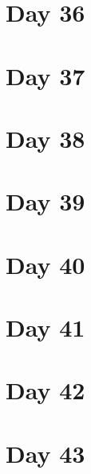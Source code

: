 \documentclass[]{book}
\begin{document}
\hypertarget{day-36}{%
\chapter{Day 36}\label{day-36}}

\hypertarget{day-37}{%
\chapter{Day 37}\label{day-37}}

\hypertarget{day-38}{%
\chapter{Day 38}\label{day-38}}

\hypertarget{day-39}{%
\chapter{Day 39}\label{day-39}}

\hypertarget{day-40}{%
\chapter{Day 40}\label{day-40}}

\hypertarget{day-41}{%
\chapter{Day 41}\label{day-41}}

\hypertarget{day-42}{%
\chapter{Day 42}\label{day-42}}

\hypertarget{day-43}{%
\chapter{Day 43}\label{day-43}}


\end{document}
